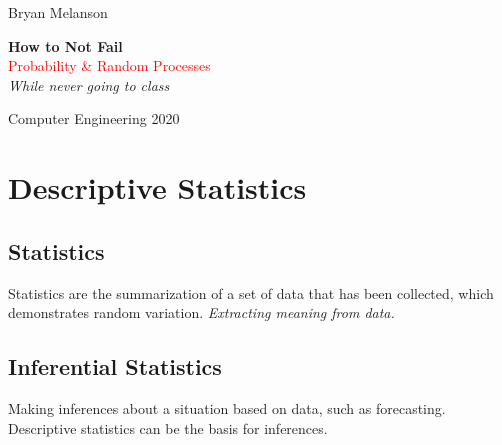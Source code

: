 \documentclass[11pt]{article}
\newcommand*{\plogo}{\fbox{$\mathcal{BM}$}}
\begin{document}
 
        
    \begin{titlepage}
    
        \raggedleft
        
        \vspace*{\baselineskip}
        
        {\Large Bryan Melanson}
        
        \vspace*{0.167\textheight}
        
        \textbf{\LARGE How to Not Fail}\\[\baselineskip]
        
        {\textcolor{Red}{\Huge Probability \& Random Processes}}\\[\baselineskip]
        
        {\Large \textit{While never going to class}}
        
        \vfill
        
        {\large Computer Engineering 2020 ~~\plogo}
        
        \vspace*{3\baselineskip}
    
    \end{titlepage}

    \pagebreak
    
    
    \tableofcontents

    \pagebreak
    \section{Descriptive Statistics}

    \subsection{Statistics}
    Statistics are the summarization of a set of data that has been collected, which demonstrates random variation. \textit{Extracting meaning from data.}

    \subsection{Inferential Statistics}
    Making inferences about a situation based on data, such as forecasting. \\
    Descriptive statistics can be the basis for inferences.
\end{document}
